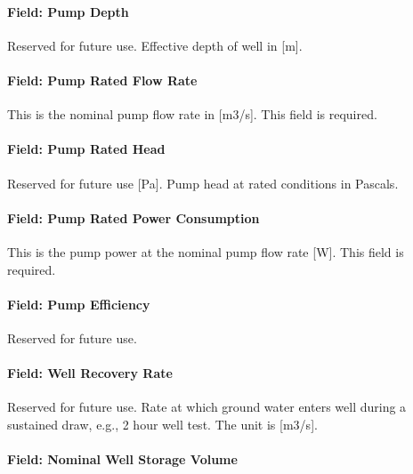 \paragraph{Field: Pump Depth}\label{field-pump-depth}

Reserved for future use. Effective depth of well in {[}m{]}.

\paragraph{Field: Pump Rated Flow Rate}\label{field-pump-rated-flow-rate}

This is the nominal pump flow rate in {[}m3/s{]}. This field is required.

\paragraph{Field: Pump Rated Head}\label{field-pump-rated-head}

Reserved for future use {[}Pa{]}. Pump head at rated conditions in Pascals.

\paragraph{Field: Pump Rated Power Consumption}\label{field-pump-rated-power-consumption}

This is the pump power at the nominal pump flow rate {[}W{]}. This field is required.

\paragraph{Field: Pump Efficiency}\label{field-pump-efficiency}

Reserved for future use.

\paragraph{Field: Well Recovery Rate}\label{field-well-recovery-rate}

Reserved for future use. Rate at which ground water enters well during a sustained draw, e.g., 2 hour well test. The unit is {[}m3/s{]}.

\paragraph{Field: Nominal Well Storage Volume}\label{field-nominal-well-storage-volume}

